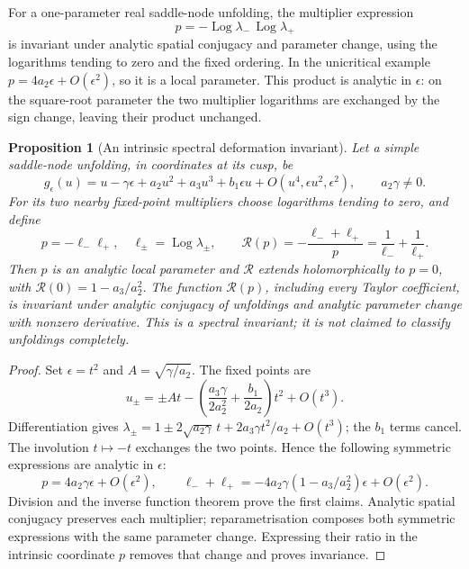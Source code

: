\documentclass[11pt]{article}
\newtheorem{proposition}[theorem]{Proposition}
\newcommand{\Log}{\operatorname{Log}}
\begin{document}
For a one-parameter real saddle-node unfolding, the multiplier expression
\[
 p=-\Log\lambda_-\,\Log\lambda_+
\]
is invariant under analytic spatial conjugacy and parameter change,
using the logarithms tending to zero and the fixed ordering. In the
unicritical example $p=4a_2\epsilon+O(\epsilon^2)$, so it is a local
parameter. This product is analytic in $\epsilon$: on the square-root
parameter the two multiplier logarithms are exchanged by the sign
change, leaving their product unchanged.

\begin{proposition}[An intrinsic spectral deformation invariant]
\label{prop:spectral-deformation}
Let a simple saddle-node unfolding, in coordinates at its cusp, be
\[
 g_\epsilon(u)=u-\gamma\epsilon+a_2u^2+a_3u^3
       +b_1\epsilon u+O(u^4,\epsilon u^2,\epsilon^2),
 \qquad a_2\gamma\ne0.
\]
For its two nearby fixed-point multipliers choose logarithms tending
to zero, and define
\[
 p=-\ell_-\ell_+,\quad \ell_\pm=\Log\lambda_\pm,\qquad
 \mathcal R(p)=-\frac{\ell_-+\ell_+}{p}
             =\frac1{\ell_-}+\frac1{\ell_+}.
\]
Then $p$ is an analytic local parameter and $\mathcal R$ extends
holomorphically to $p=0$, with $\mathcal R(0)=1-a_3/a_2^2$.
The function $\mathcal R(p)$, including every Taylor coefficient, is
invariant under analytic conjugacy of unfoldings and analytic parameter
change with nonzero derivative. This is a spectral invariant; it is
not claimed to classify unfoldings completely.
\end{proposition}
\begin{proof}
Set $\epsilon=t^2$ and $A=\sqrt{\gamma/a_2}$. The fixed points are
\[
 u_\pm=\pm At-\left(\frac{a_3\gamma}{2a_2^2}
                     +\frac{b_1}{2a_2}\right)t^2+O(t^3).
\]
Differentiation gives
$\lambda_\pm=1\pm2\sqrt{a_2\gamma}\,t+
2a_3\gamma t^2/a_2+O(t^3)$; the $b_1$ terms cancel.
The involution $t\mapsto-t$ exchanges the two points. Hence the
following symmetric expressions are analytic in $\epsilon$:
\[
 p=4a_2\gamma\epsilon+O(\epsilon^2),\qquad
 \ell_-+\ell_+=-4a_2\gamma
                  (1-a_3/a_2^2)\epsilon+O(\epsilon^2).
\]
Division and the inverse function theorem prove the first claims.
Analytic spatial conjugacy preserves each multiplier; reparametrisation
composes both symmetric expressions with the same parameter change.
Expressing their ratio in the intrinsic coordinate $p$ removes that
change and proves invariance.
\end{proof}
\end{document}
